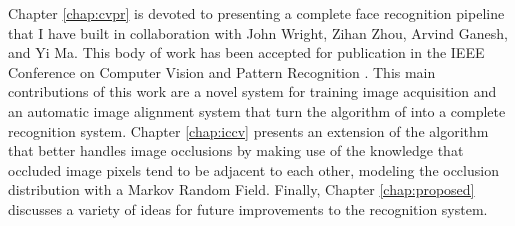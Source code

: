Chapter \ref{chap:cvpr} is devoted to presenting a complete face recognition
pipeline that I have built in collaboration with John Wright, Zihan Zhou,
Arvind Ganesh, and Yi Ma.  This body of work has been accepted for publication
in the IEEE Conference on Computer Vision and Pattern Recognition
\cite{Wagner2009-CVPR}.  This main contributions of this work are a novel
system for training image acquisition and an automatic image alignment system
that turn the algorithm of \cite{Wright2009-PAMI} into a complete recognition
system.  Chapter \ref{chap:iccv} presents an extension of the algorithm that
better handles image occlusions by making use of the knowledge that occluded
image pixels tend to be adjacent to each other, modeling the occlusion
distribution with a Markov Random Field.  Finally, Chapter \ref{chap:proposed}
discusses a variety of ideas for future improvements to the recognition system.




